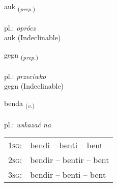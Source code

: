 \documentclass[frontgrid, backgrid]{flacards}\usepackage[]{graphicx}\usepackage[]{xcolor}
\begin{document}
\renewcommand{\blhead}{\vskip5pt {\small\bfseries\footnotesize Forsetning | Preposition }}
\renewcommand{\bcfoot}{\vskip5pt \hspace{2pt}{\small\bfseries\footnotesize 1K}}


{auk \small{\textsubscript{(\textit{prep.})}} \\[1ex]
\textphonetic{[œiːk]} \\
pl.: \emph{oprócz} \\  [2ex]
auk (Indeclinable)}


\renewcommand{\flhead}{\vskip5pt \fboxsep=0pt {\small\bfseries\footnotesize Forsetning | Preposition}}
\renewcommand{\fcfoot}{\vskip5pt \fboxsep=0pt \hspace{2pt}{\small\bfseries\footnotesize 1K}}

\renewcommand{\blhead}{\vskip5pt {\small\bfseries\footnotesize Forsetning | Preposition }}
\renewcommand{\bcfoot}{\vskip5pt \hspace{2pt}{\small\bfseries\footnotesize 1K}}


{gegn \small{\textsubscript{(\textit{prep.})}} \\[1ex]
\textphonetic{[cɛkn̥]} \\
pl.: \emph{przeciwko} \\  [2ex]
gegn (Indeclinable)}

\renewcommand{\flhead}{\vskip5pt \fboxsep=0pt {\small\bfseries\footnotesize Sagnorð | Verb}}
\renewcommand{\fcfoot}{\vskip5pt \fboxsep=0pt \hspace{2pt}{\small\bfseries\footnotesize 1K}}

\renewcommand{\blhead}{\vskip5pt {\small\bfseries\footnotesize Sagnorð | Verb }}
\renewcommand{\bcfoot}{\vskip5pt \hspace{2pt}{\small\bfseries\footnotesize 1K}}


{benda \small{\textsubscript{(\textit{v.})}} \\[1ex] %
\textphonetic{[pɛnta]} \\
pl.: \emph{wskazać na} \\  [2ex]
\renewcommand*{\arraystretch}{0.8}
\begin{tabular}{p{1cm}l}
\textsc{1sg}: & bendi -- benti -- bent \\ 
\textsc{2sg}: & bendir -- bentir -- bent \\ 
\textsc{3sg}: & bendir -- benti -- bent \\ 
\end{tabular}
}
\end{document}
